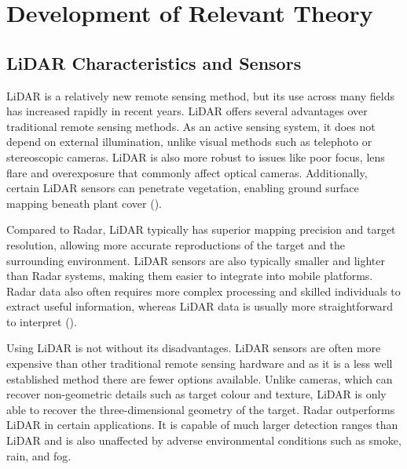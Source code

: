 \chapter{Development of Relevant Theory}
\label{ch:theory}

\section{LiDAR Characteristics and Sensors}
\label{sec:ch3:section1}

\ac{LiDAR} is a relatively new remote sensing method, but its use across many fields has increased rapidly in recent years. \ac{LiDAR} offers several advantages over traditional remote sensing methods. As an active sensing system, it does not depend on external illumination, unlike visual methods such as telephoto or stereoscopic cameras. \ac{LiDAR} is also more robust to issues like poor focus, lens flare and overexposure that commonly affect optical cameras. Additionally, certain \ac{LiDAR} sensors can penetrate vegetation, enabling ground surface mapping beneath plant cover (\cite{wangChallengesOpportunitiesLidar2021}).

Compared to \ac{Radar}, \ac{LiDAR} typically has superior mapping precision and target resolution, allowing more accurate reproductions of the target and the surrounding environment. \ac{LiDAR} sensors are also typically smaller and lighter than \ac{Radar} systems, making them easier to integrate into mobile platforms. \ac{Radar} data also often requires more complex processing and skilled individuals to extract useful information, whereas \ac{LiDAR} data is usually more straightforward to interpret (\cite{agrawalCOMPARATIVEASSESSMENTREMOTE2019}).

Using \ac{LiDAR} is not without its disadvantages. \ac{LiDAR} sensors are often more expensive than other traditional remote sensing hardware and as it is a less well established method there are fewer options available. Unlike cameras, which can recover non-geometric details such as target colour and texture, \ac{LiDAR} is only able to recover the three-dimensional geometry of the target. \ac{Radar} outperforms \ac{LiDAR} in certain applications. It is capable of much larger detection ranges than \ac{LiDAR} and is also unaffected by adverse environmental conditions such as smoke, rain, and fog.


